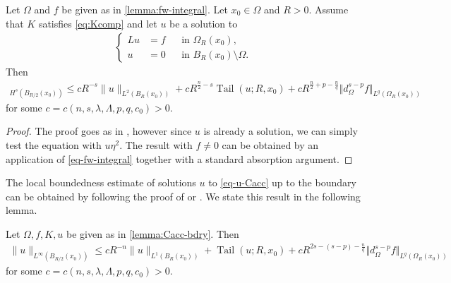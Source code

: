 \documentclass[11pt,reqno]{amsart}
\theoremstyle{plain}
\theoremstyle{definition}
\numberwithin{equation}{section}
\newcommand{\1}{\mathbbm{1}}
\DeclareMathOperator{\tail}{Tail}
\begin{document}
\begin{lemma}
\label{lemma:Cacc-bdry}
Let $\Omega$ and $f$ be given as in \autoref{lemma:fw-integral}. Let $x_0 \in \Omega$ and $R>0$. Assume that $K$ satisfies \eqref{eq:Kcomp} and let $u$ be a solution to
\begin{align}\label{eq-u-Cacc}
\left\{
\begin{aligned}
Lu&=f &&\text{in }\Omega_R(x_0), \\
u&=0 &&\text{in }B_R(x_0) \setminus \Omega.
\end{aligned}
\right.
\end{align}
Then
\begin{align*}
    [u]_{H^s(B_{R/2}(x_0))} \le c R^{-s} \|u\|_{L^2(B_R(x_0))} + c R^{\frac{n}{2}-s} \tail(u;R,x_0) + c R^{\frac{n}{2} + p - \frac{n}{q}} \Vert d^{s-p}_{\Omega} f \Vert_{L^q(\Omega_R(x_0))}
\end{align*}
for some $c=c(n, s, \lambda, \Lambda, p, q, c_0)>0$.
\end{lemma}

\begin{proof}
The proof goes as in \cite[Lemma~3.5]{KiLe23}, however since $u$ is already a solution, we can simply test the equation with $u \eta^2$. The result with $f \not= 0$ can be obtained by an application of \eqref{eq-fw-integral} together with a standard absorption argument.
\end{proof}

The local boundedness estimate of solutions $u$ to \eqref{eq-u-Cacc} up to the boundary can be obtained by following the proof of \cite[Theorem~3.1]{KiLe23} or \cite[Theorem~5]{KKP16}. We state this result in the following lemma.

\begin{lemma}
\label{lemma:locbd-bdry}
Let $\Omega, f, K, u$ be given as in \autoref{lemma:Cacc-bdry}. Then
\begin{align*}
\|u\|_{L^\infty(B_{R/2}(x_0))} \le c R^{-n} \|u\|_{L^1(B_R(x_0))} + \tail(u; R, x_0) + c R^{2s - (s-p) - \frac{n}{q}} \Vert d^{s-p}_{\Omega} f \Vert_{L^q(\Omega_R(x_0))}
\end{align*}
for some $c=c(n, s, \lambda, \Lambda, p, q, c_0)>0$.
\end{lemma}
\end{document}
